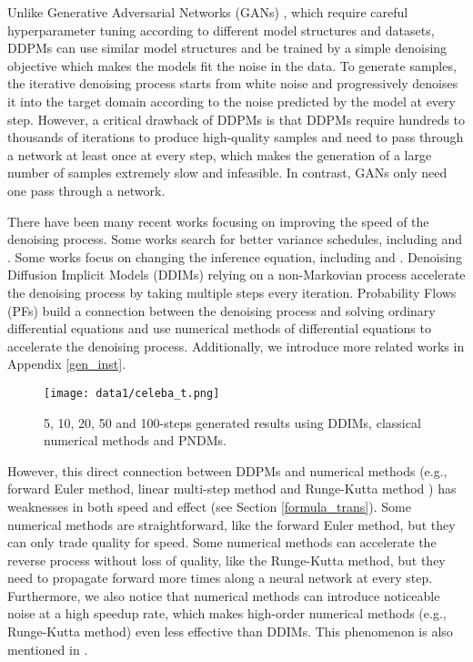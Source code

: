 \documentclass{article}
\begin{document}
Unlike Generative Adversarial Networks (GANs) \citep{goodfellow2014}, which require careful hyperparameter tuning according to different model structures and datasets, DDPMs can use similar model structures and be trained by a simple denoising objective which makes the models fit the noise in the data. To generate samples, the iterative denoising process starts from white noise and progressively denoises it into the target domain according to the noise predicted by the model at every step. However, a critical drawback of DDPMs is that DDPMs require hundreds to thousands of iterations to produce high-quality samples and need to pass through a network at least once at every step, which makes the generation of a large number of samples extremely slow and infeasible. In contrast, GANs only need one pass through a network. 

There have been many recent works focusing on improving the speed of the denoising process. Some works search for better variance schedules, including \citet{Nichol2021} and \citet{Watson2021}. Some works focus on changing the inference equation, including \citet{Song2020a} and \citet{Song2020}. Denoising Diffusion Implicit Models (DDIMs) \citep{Song2020a} relying on a non-Markovian process accelerate the denoising process by taking multiple steps every iteration. Probability Flows (PFs) \citep{Song2020} build a connection between the denoising process and solving ordinary differential equations and use numerical methods of differential equations to accelerate the denoising process. Additionally, we introduce more related works in Appendix \ref{gen_inst}.

\begin{wrapfigure}{R}{0.6\linewidth}
   \vspace*{-0.5cm}
   \centering
   \texttt{[image: data1/celeba\_t.png]}
   \caption{5, 10, 20, 50 and 100-steps generated results using DDIMs, classical numerical methods and PNDMs.}
   \vspace*{-0.5cm}
\end{wrapfigure}

However, this direct connection between DDPMs and numerical methods (e.g., forward Euler method, linear multi-step method and Runge-Kutta method \citep{Sauer2017}) has weaknesses in both speed and effect (see Section \ref{formula_trans}). Some numerical methods are straightforward, like the forward Euler method, but they can only trade quality for speed. Some numerical methods can accelerate the reverse process without loss of quality, like the Runge-Kutta method, but they need to propagate forward more times along a neural network at every step. Furthermore, we also notice that numerical methods can introduce noticeable noise at a high speedup rate, which makes high-order numerical methods (e.g., Runge-Kutta method) even less effective than DDIMs. This phenomenon is also mentioned in \citet{salimans2022progressive}.
\end{document}
